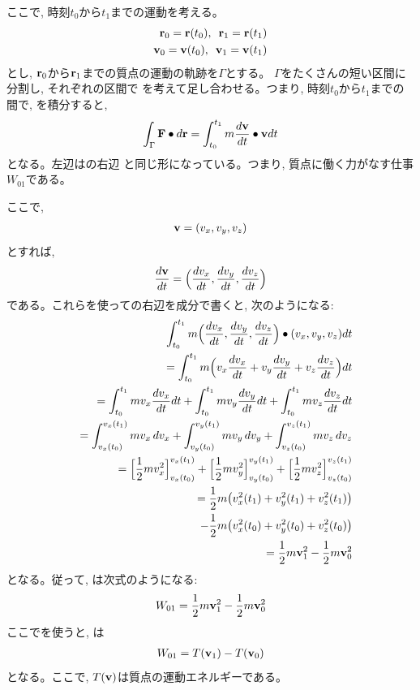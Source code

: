 ここで, 時刻$t_0$から$t_1$までの運動を考える。
\begin{eqnarray*}
{\bf r}_0={\bf r}(t_0), \,\,\,
{\bf r}_1={\bf r}(t_1)\\
{\bf v}_0={\bf v}(t_0), \,\,\,
{\bf v}_1={\bf v}(t_1)
\end{eqnarray*}
とし, ${\bf r}_0$から${\bf r}_1$までの質点の運動の軌跡を$\Gamma$とする。
$\Gamma$をたくさんの短い区間に分割し, それぞれの区間で
を考えて足し合わせる。つまり, 時刻$t_0$から$t_1$までの間で, 
を積分すると, 
\begin{eqnarray}
\int_{\Gamma}{\bf F}\bullet d{\bf r}=\int_{t_0}^{t_1}m\frac{d{\bf v}}{dt}\bullet {\bf v}dt\label{eq:3D_WandT00s}
\end{eqnarray}
となる。左辺はの右辺
と同じ形になっている。つまり, 質点に働く力がなす仕事$W_{01}$である。

ここで, 
\begin{eqnarray}
{\bf v}=(v_x, v_y, v_z)
\end{eqnarray}
とすれば, 
\begin{eqnarray}
\frac{d{\bf v}}{dt}=\Bigl(\frac{dv_x}{dt}, \frac{dv_y}{dt}, \frac{dv_z}{dt}\Bigr)
\end{eqnarray}
である。これらを使っての右辺を成分で書くと, 次のようになる:
\begin{eqnarray}
&&\int_{t_0}^{t_1}m\Bigl(\frac{dv_x}{dt}, \frac{dv_y}{dt}, \frac{dv_z}{dt}\Bigr)\bullet(v_x, v_y, v_z)dt\\
&&=\int_{t_0}^{t_1}m\Bigl(v_x\frac{dv_x}{dt}+v_y\frac{dv_y}{dt}+v_z\frac{dv_z}{dt}\Bigr)dt\\
&&=\int_{t_0}^{t_1}mv_x\frac{dv_x}{dt}dt+\int_{t_0}^{t_1}mv_y\frac{dv_y}{dt}dt+\int_{t_0}^{t_1}mv_z\frac{dv_z}{dt}dt\nonumber\\
&&=\int_{v_x(t_0)}^{v_x(t_1)}mv_x\,dv_x+\int_{v_y(t_0)}^{v_y(t_1)}mv_y\,dv_y+\int_{v_z(t_0)}^{v_z(t_1)}mv_z\,dv_z\nonumber\\
&&=\Bigl[\frac{1}{2}m v_x^2\Bigr]_{v_x(t_0)}^{v_x(t_1)}+\Bigl[\frac{1}{2}m v_y^2\Bigr]_{v_y(t_0)}^{v_y(t_1)}+\Bigl[\frac{1}{2}m v_z^2\Bigr]_{v_z(t_0)}^{v_z(t_1)}\nonumber\\
&&=\frac{1}{2}m\bigl(v_x^2(t_1)+v_y^2(t_1)+v_z^2(t_1)\bigr)\nonumber\\
&&\,\,\,\,-\frac{1}{2}m\bigl(v_x^2(t_0)+v_y^2(t_0)+v_z^2(t_0)\bigr)\\
&&=\frac{1}{2}m{\bf v}_1^2-\frac{1}{2}m{\bf v}_0^2
\end{eqnarray}
となる。従って, は次式のようになる:
\begin{eqnarray}
W_{01}=\frac{1}{2}m{\bf v}_1^2-\frac{1}{2}m{\bf v}_0^2\label{eq:3DWandT0}
\end{eqnarray}
ここでを使うと, は
\begin{eqnarray}
W_{01}=T({\bf v}_1)-T({\bf v}_0)\label{eq:3D_WandT2}
\end{eqnarray}
となる。ここで, $T({\bf v})$は質点の運動エネルギーである。

